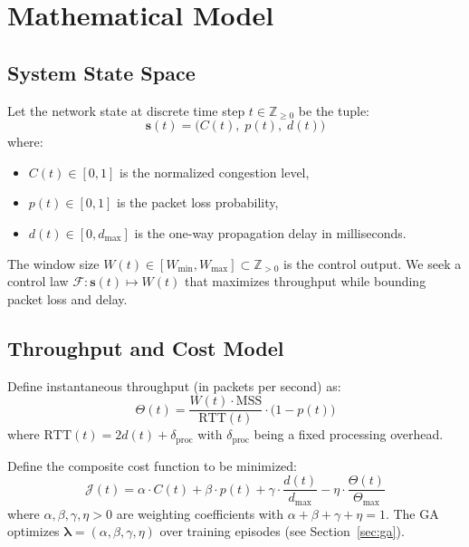 \documentclass[10pt, twocolumn]{IEEEtran}
\theoremstyle{definition}
\begin{document}
\section{Mathematical Model}
\label{sec:model}

\subsection{System State Space}

Let the network state at discrete time step $t \in \mathbb{Z}_{\geq 0}$ be the tuple:
\begin{equation}
  \mathbf{s}(t) = \bigl(C(t),\; p(t),\; d(t)\bigr)
\end{equation}
where:
\begin{itemize}
  \item $C(t) \in [0,1]$ is the normalized congestion level,
  \item $p(t) \in [0,1]$ is the packet loss probability,
  \item $d(t) \in [0, d_{\max}]$ is the one-way propagation delay in milliseconds.
\end{itemize}

The window size $W(t) \in [W_{\min}, W_{\max}] \subset \mathbb{Z}_{>0}$ is the control output. We seek a control law $\mathcal{F}: \mathbf{s}(t) \mapsto W(t)$ that maximizes throughput while bounding packet loss and delay.

\subsection{Throughput and Cost Model}

Define instantaneous throughput (in packets per second) as:
\begin{equation}
  \Theta(t) = \frac{W(t) \cdot \text{MSS}}{\text{RTT}(t)} \cdot \bigl(1 - p(t)\bigr)
  \label{eq:throughput}
\end{equation}
where $\text{RTT}(t) = 2d(t) + \delta_{\text{proc}}$ with $\delta_{\text{proc}}$ being a fixed processing overhead.

Define the composite cost function to be minimized:
\begin{equation}
  \mathcal{J}(t) = \alpha \cdot C(t) + \beta \cdot p(t) + \gamma \cdot \frac{d(t)}{d_{\max}} - \eta \cdot \frac{\Theta(t)}{\Theta_{\max}}
  \label{eq:cost}
\end{equation}
where $\alpha, \beta, \gamma, \eta > 0$ are weighting coefficients with $\alpha + \beta + \gamma + \eta = 1$. The GA optimizes $\boldsymbol{\lambda} = (\alpha, \beta, \gamma, \eta)$ over training episodes (see Section~\ref{sec:ga}).
\end{document}

